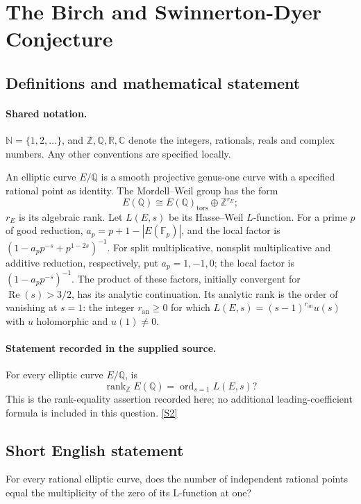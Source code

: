 \documentclass[11pt]{article}
\newcommand{\sref}[2]{\hyperlink{source:#1:#2}{[S#2]}}
\begin{document}
\section{The Birch and Swinnerton-Dyer Conjecture}\label{statement}

\subsection{Definitions and mathematical statement}

\paragraph{Shared notation.}$\mathbb N=\{1,2,\ldots\}$, and $\mathbb Z,\mathbb Q,\mathbb R,\mathbb C$ denote the integers, rationals, reals and complex numbers. Any other conventions are specified locally.


An elliptic curve \(E/\mathbb Q\) is a smooth projective genus-one
curve with a specified rational point as identity.  The Mordell--Weil
group has the form
\[
 E(\mathbb Q)\cong E(\mathbb Q)_{\mathrm{tors}}\oplus\mathbb Z^{r_E};
\]
\(r_E\) is its algebraic rank.  Let \(L(E,s)\) be its Hasse--Weil
\(L\)-function.  For a prime \(p\) of good reduction,
\(a_p=p+1-|E(\mathbb F_p)|\), and the local factor is
\((1-a_pp^{-s}+p^{1-2s})^{-1}\).
For split multiplicative, nonsplit multiplicative and additive
reduction, respectively, put \(a_p=1,-1,0\); the local factor is
\((1-a_pp^{-s})^{-1}\).  The product of these factors, initially
convergent for \(\operatorname{Re}(s)>3/2\), has its analytic
continuation.  Its analytic rank is the order of vanishing at \(s=1\):
the integer \(r_{\mathrm{an}}\ge0\) for which
\(L(E,s)=(s-1)^{r_{\mathrm{an}}}u(s)\) with \(u\) holomorphic and
\(u(1)\ne0\).
\paragraph{Statement recorded in the supplied source.}
For every elliptic curve \(E/\mathbb Q\), is
\[
 \operatorname{rank}_{\mathbb Z}E(\mathbb Q)
       =\operatorname{ord}_{s=1}L(E,s)?
\]
This is the rank-equality assertion recorded here; no additional
leading-coefficient formula is included in this question. \sref{statement}{2}
\subsection{Short English statement}
For every rational elliptic curve, does the number of independent rational points equal the multiplicity of the zero of its L-function at one?
\end{document}
